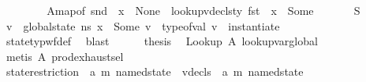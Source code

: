 \begin{isabellebody}
\ \ \isamarkupfalse%
\isanewline
\ \ \ \ \isamarkupfalse%
\ A{}{\isacharcolon}{\kern0pt}{\isachardoublequoteopen}map{\isacharunderscore}{\kern0pt}of\ {\isacharparenleft}{\kern0pt}snd\ {\isasymLambda}{\isacharparenright}{\kern0pt}\ x\ {\isacharequal}{\kern0pt}\ None\ {\isasymand}\ lookup{\isacharunderscore}{\kern0pt}vdecls{\isacharunderscore}{\kern0pt}ty\ {\isacharparenleft}{\kern0pt}fst\ {\isasymLambda}{\isacharparenright}{\kern0pt}\ x\ {\isacharequal}{\kern0pt}\ Some\ {\isasymtau}{\isachardoublequoteclose}\isanewline
\ \ \ \ \isamarkupfalse%
\ S{}\ \isamarkupfalse%
\ v\ \ {\isachardoublequoteopen}{\isacharparenleft}{\kern0pt}global{\isacharunderscore}{\kern0pt}state\ ns{\isacharparenright}{\kern0pt}\ x\ {\isacharequal}{\kern0pt}\ Some\ v{\isachardoublequoteclose}\ \ {\isachardoublequoteopen}type{\isacharunderscore}{\kern0pt}of{\isacharunderscore}{\kern0pt}val\ v\ {\isacharequal}{\kern0pt}\ instantiate\ {\isasymOmega}\ {\isasymtau}{\isachardoublequoteclose}\isanewline
\ \ \ \ \ \ \isamarkupfalse%
\ state{\isacharunderscore}{\kern0pt}typ{\isacharunderscore}{\kern0pt}wf{\isacharunderscore}{\kern0pt}def\ \isamarkupfalse%
\ blast\isanewline
\ \ \ \ \isamarkupfalse%
\ {\isacharquery}{\kern0pt}thesis\ \isamarkupfalse%
\ Lookup\ A{}\ lookup{\isacharunderscore}{\kern0pt}var{\isacharunderscore}{\kern0pt}global\isanewline
\ \ \ \ \ \ \isamarkupfalse%
\ {\isacharparenleft}{\kern0pt}metis\ A{}\ prod{\isachardot}{\kern0pt}exhaust{\isacharunderscore}{\kern0pt}sel{\isacharparenright}{\kern0pt}\isanewline
\ \ \isamarkupfalse%
\isanewline
{}\isamarkupfalse%
%
\endisatagproof
{\isafoldproof}%
%
\isadelimproof
%
\endisadelimproof
%
\isadelimdocument
%
\endisadelimdocument
%
\isatagdocument
%
\isamarkuptrue%
%
\endisatagdocument
{\isafolddocument}%
%
\isadelimdocument
%
\endisadelimdocument
{}\isamarkupfalse%
\ state{\isacharunderscore}{\kern0pt}restriction\ {\isacharcolon}{\kern0pt}{\isacharcolon}{\kern0pt}\ {\isachardoublequoteopen}{\isacharparenleft}{\kern0pt}{\isacharprime}{\kern0pt}a{\isacharcomma}{\kern0pt}\ {\isacharprime}{\kern0pt}m{\isacharparenright}{\kern0pt}\ named{\isacharunderscore}{\kern0pt}state\ {\isasymRightarrow}\ vdecls\ {\isasymRightarrow}\ {\isacharparenleft}{\kern0pt}{\isacharprime}{\kern0pt}a{\isacharcomma}{\kern0pt}\ {\isacharprime}{\kern0pt}m{\isacharparenright}{\kern0pt}\ named{\isacharunderscore}{\kern0pt}state{\isachardoublequoteclose}\isanewline

\end{isabellebody}
